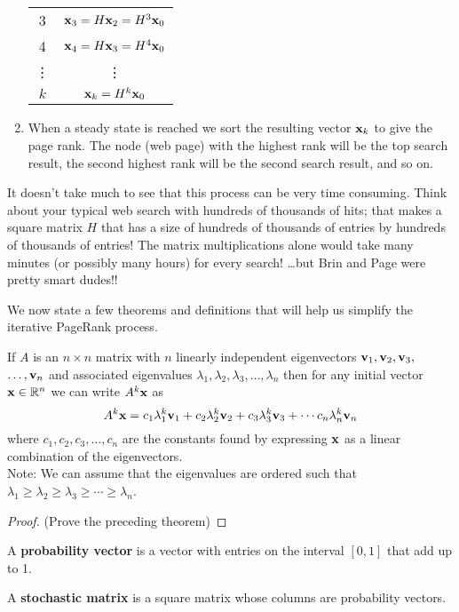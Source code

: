 \begin{enumerate}
\begin{center}
\begin{tabular}{|c|c|}
                3 & ${\bf x}_3 = H {\bf x}_2 = H^3 {\bf x}_0$ \\
                4 & ${\bf x}_4 = H {\bf x}_3 = H^4 {\bf x}_0$ \\
                \vdots & \qquad \vdots \\
                $k$ & ${\bf x}_k = H^k {\bf x}_0$ \\ \hline
            \end{tabular}
        \end{center}
    \item When a steady state is reached we sort the resulting vector ${\bf x}_k$ to give the
        page rank. The node (web page) with the highest rank will be the top search
        result, the second highest rank will be the second search result, and so on.
\end{enumerate}

It doesn't take much to see that this process can be very time consuming.  Think about
your typical web search with hundreds of thousands of hits; that makes a square matrix $H$
that has a size of hundreds of thousands of entries by hundreds of thousands of entries!
The matrix multiplications alone would take many minutes (or possibly many hours) for
every search! \dots but Brin and Page were pretty smart dudes!!


We now state a few theorems and definitions that will help us simplify the iterative
PageRank process.
\begin{thm}\label{thm:eigen_expand}
    If $A$ is an $n \times n$ matrix with $n$ linearly independent eigenvectors ${\bf v}_1,
    {\bf v}_2, {\bf v}_3,$ $\ldots, {\bf v}_n$ and associated eigenvalues $\lambda_1, \lambda_2,
    \lambda_3, \ldots, \lambda_n$ then for any initial vector ${\bf x} \in \mathbb{R}^n$ we
    can write $A^k {\bf x}$ as
    \[ A^k {\bf x} = c_1 \lambda_1^k {\bf v}_1 + c_2 \lambda_2^k {\bf v}_2 + c_3 \lambda_3^k {\bf v}_3 +
        \cdots c_n \lambda_n^k {\bf v}_n \]
    where $c_1, c_2, c_3, \ldots, c_n$ are the constants found by expressing ${\bf x}$ as a
    linear combination of the eigenvectors. \\Note: We can assume that the eigenvalues are ordered
    such that $\lambda_1 \ge \lambda_2 \ge \lambda_3 \ge \cdots \ge \lambda_n$.
\end{thm}
\begin{proof}
    (Prove the preceding theorem)
\end{proof}

\begin{definition}
    A {\bf probability vector} is a vector with entries on the interval $[0,1]$ that add up to 1. 
\end{definition}
\begin{definition}
    A {\bf stochastic matrix} is a square matrix whose columns are probability vectors.
\end{definition}

